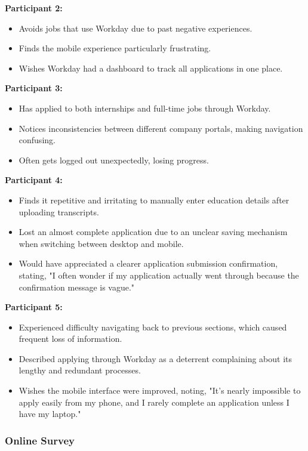 \documentclass[
	letterpaper, %
]{jdf}
\begin{document}
\begin{sloppypar}
\textbf{Participant 2:}  
\begin{itemize}  
    \item Avoids jobs that use Workday due to past negative experiences.  
    \item Finds the mobile experience particularly frustrating.  
    \item Wishes Workday had a dashboard to track all applications in one place.  
\end{itemize}  

\textbf{Participant 3:}  
\begin{itemize}  
    \item Has applied to both internships and full-time jobs through Workday.  
    \item Notices inconsistencies between different company portals, making navigation confusing.  
    \item Often gets logged out unexpectedly, losing progress.  
\end{itemize}    

\textbf{Participant 4:}  
\begin{itemize}  
\item Finds it repetitive and irritating to manually enter education details after uploading transcripts.
\item Lost an almost complete application due to an unclear saving mechanism when switching between desktop and mobile.
\item Would have appreciated a clearer application submission confirmation, stating, "I often wonder if my application actually went through because the confirmation message is vague."
\end{itemize}  

\textbf{Participant 5:}  
\begin{itemize}
\item Experienced difficulty navigating back to previous sections, which caused frequent loss of information.
\item Described applying through Workday as a deterrent complaining about its lengthy and redundant processes.
\item Wishes the mobile interface were improved, noting, "It’s nearly impossible to apply easily from my phone, and I rarely complete an application unless I have my laptop."
\end{itemize}  
\hfill \break

\subsubsection*{Online Survey}  


\end{sloppypar}
\end{document}

